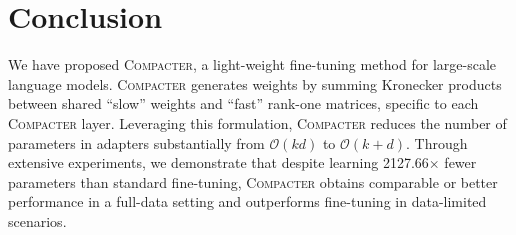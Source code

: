 \section{Conclusion}
We have proposed \textsc{Compacter}, a light-weight fine-tuning method for large-scale language models. \textsc{Compacter} generates weights by summing Kronecker products between shared ``slow'' weights and ``fast'' rank-one matrices, specific to each \textsc{Compacter} layer. Leveraging this formulation, \textsc{Compacter} reduces the number of parameters in adapters substantially from $\mathcal{O}(kd)$ to $\mathcal{O}(k+d)$. Through extensive experiments, we demonstrate that despite learning 2127.66$\times$ fewer parameters than standard fine-tuning, \textsc{Compacter} obtains comparable or better performance in a full-data setting and outperforms fine-tuning in data-limited scenarios. 


